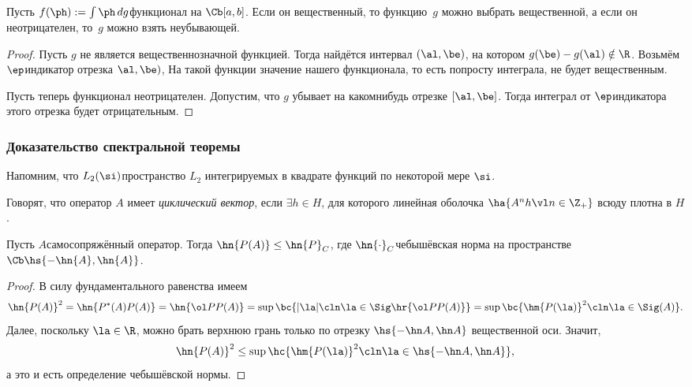 \documentclass[a4paper]{article}
\begin{document}
\begin{stm}
Пусть $f(\ph) := \int \ph\, dg$\т функционал на $\Cb[a,b]$. Если он вещественный,
то функцию~$g$ можно выбрать вещественной, а если он неотрицателен, то~$g$ можно
взять неубывающей.
\end{stm}
\begin{proof}
Пусть $g$ не является вещественнозначной функцией. Тогда найдётся интервал $(\al,\be)$, на котором
$g(\be) - g(\al) \notin \R$. Возьмём $\ep$\д индикатор отрезка $\al, \be)$,
На такой функции значение нашего функционала, то есть попросту интеграла, не будет вещественным.

Пусть теперь функционал неотрицателен. Допустим, что $g$ убывает на каком\д нибудь отрезке $[\al,\be]$.
Тогда интеграл от $\ep$\д индикатора этого отрезка будет отрицательным.
\end{proof}

\subsubsection{Доказательство спектральной теоремы}

Напомним, что $L_2(\si)$\т пространство $L_2$ интегрируемых в квадрате функций по некоторой мере $\si$.

\begin{df}
Говорят, что оператор $A$ имеет \emph{циклический вектор}, если $\exi h \in H$, для которого линейная оболочка
$\ha{A^n h \vl n \in \Z_+}$ всюду плотна в $H$.
\end{df}

\begin{lemma}
Пусть $A$\т самосопряжённый оператор. Тогда
$\hn{P(A)} \le \hn{P}_C$, где $\hn{\cdot}_C$\т чебышёвская норма на пространстве $\Cb\hs{-\hn{A}, \hn{A}}$.
\end{lemma}
\begin{proof}
В силу фундаментального равенства имеем
$$\hn{P(A)}^2 = \hn{P^*(A)P(A)} = \hn{\ol P P(A)} =
  \sup \bc{|\la|\cln \la \in \Sig\hr{\ol P P(A)}} =
  \sup\bc{\hm{P(\la)}^2\cln \la \in \Sig(A)}.$$
Далее, поскольку $\la \in \R$, можно брать верхнюю грань только по отрезку $\hs{-\hn A, \hn A}$ вещественной оси.
Значит,
$$\hn{P(A)}^2 \le \sup \hc{\hm{P(\la)}^2\cln \la \in \hs{-\hn A, \hn A}},$$
а это и есть определение чебышёвской нормы.
\end{proof}
\end{document}
